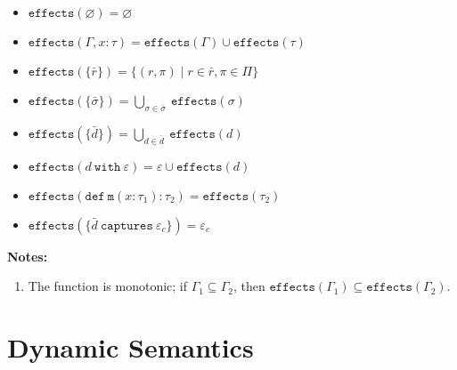 \documentclass{llncs}
\newcommand{\keywadj}[1]{\mathtt{#1}}
\newcommand{\keyw}[1]{\keywadj{#1}~}
\newcommand{\kwa}[1]{\keywadj{ #1 }}
\begin{document}
\begin{itemize}
	\item $\keywadj{effects}(\varnothing) = \varnothing$
	\item $\keywadj{effects}(\Gamma, x : \tau) = \keywadj{effects}(\Gamma) \cup \keywadj{effects}(\tau)$
	\item $\keywadj{effects}(\{\bar r\}) = \{ (r, \pi) \mid r \in \bar r, \pi \in \Pi \}$
	\item $\keywadj{effects}(\{\bar \sigma\}) = \bigcup_{\sigma \in \bar \sigma}~\keywadj{effects}(\sigma)$
	\item $\keywadj{effects}(\{\bar d\}) = \bigcup_{d \in \bar d}~\keywadj{effects}(d)$
	\item $\keywadj{effects}(d~\keyw{with} \varepsilon) = \varepsilon \cup \keywadj{effects}(d)$
	\item $\keywadj{effects}(\keywadj{def~m}(x : \tau_1) : \tau_2) = \keywadj{effects}(\tau_2)$
	\item $\keywadj{effects}(\{\bar d ~\keyw{captures} \varepsilon_c\}) = \varepsilon_c$
\end{itemize}

\noindent \textbf{Notes:}

\begin{enumerate}
	\item The function is monotonic; if $\Gamma_1 \subseteq \Gamma_2$, then $\kwa{effects}(\Gamma_1) \subseteq \kwa{effects}(\Gamma_2)$.
\end{enumerate}


\section{Dynamic Semantics}

~\\
\noindent
{}
\end{document}

